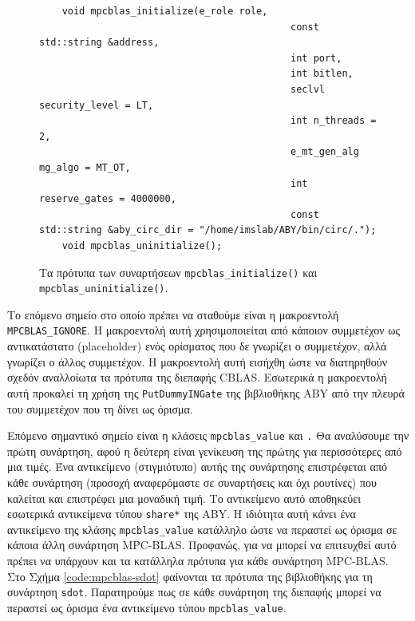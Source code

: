 \begin{figure}[h!]
    \begin{center}
        \begin{verbatim}
    void mpcblas_initialize(e_role role,
                                            const std::string &address,
                                            int port,
                                            int bitlen,
                                            seclvl security_level = LT,
                                            int n_threads = 2,
                                            e_mt_gen_alg mg_algo = MT_OT,
                                            int reserve_gates = 4000000,
                                            const std::string &aby_circ_dir = "/home/imslab/ABY/bin/circ/.");
    void mpcblas_uninitialize();
        \end{verbatim}
    \end{center}
    \caption{Τα πρότυπα των συναρτήσεων \texttt{mpcblas_initialize()} και \texttt{mpcblas_uninitialize()}.}
    \label{code:mpcblas-initialize-uninitialize}
\end{figure}

Το επόμενο σημείο στο οποίο πρέπει να σταθούμε είναι η μακροεντολή \texttt{MPCBLAS_IGNORE}. Η μακροεντολή αυτή χρησιμοποιείται από κάποιον συμμετέχον ως αντικατάστατο (placeholder) ενός ορίσματος που δε γνωρίζει ο συμμετέχον, αλλά γνωρίζει ο άλλος συμμετέχον. Η μακροεντολή αυτή εισήχθη ώστε να διατηρηθούν σχεδόν αναλλοίωτα τα πρότυπα της διεπαφής CBLAS. Εσωτερικά η μακροεντολή αυτή προκαλεί τη χρήση της \texttt{PutDummyINGate} της βιβλιοθήκης ABY από την πλευρά του συμμετέχον που τη δίνει ως όρισμα.

Επόμενο σημαντικό σημείο είναι η κλάσεις \texttt{mpcblas_value} και \texttt. Θα αναλύσουμε την πρώτη συνάρτηση, αφού η δεύτερη είναι γενίκευση της πρώτης για περισσότερες από μια τιμές. Ένα αντικείμενο (στιγμιότυπο) αυτής της συνάρτησης επιστρέφεται από κάθε συνάρτηση (προσοχή αναφερόμαστε σε συναρτήσεις και όχι ρουτίνες) που καλείται και επιστρέφει μια μοναδική τιμή. Το αντικείμενο αυτό αποθηκεύει εσωτερικά αντικείμενα τύπου \texttt{share*} της ABY. Η ιδιότητα αυτή κάνει ένα αντικείμενο της κλάσης \texttt{mpcblas_value} κατάλληλο ώστε να περαστεί ως όρισμα σε κάποια άλλη συνάρτηση MPC-BLAS. Προφανώς, για να μπορεί να επιτευχθεί αυτό πρέπει να υπάρχουν και τα κατάλληλα πρότυπα για κάθε συνάρτηση MPC-BLAS. Στο Σχήμα \ref{code:mpcblas-sdot} φαίνονται τα πρότυπα της βιβλιοθήκης για τη συνάρτηση \texttt{sdot}. Παρατηρούμε πως σε κάθε συνάρτηση της διεπαφής μπορεί να περαστεί ως όρισμα ένα αντικείμενο τύπου \texttt{mpcblas_value}.


